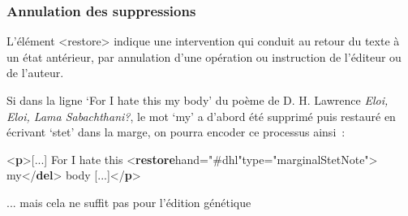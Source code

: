 \documentclass[]{beamer}\makeatletter
\begin{document}
\begin{frame}[fragile]
\frametitle{Annulation des suppressions}\par
 L’élément {\color{blue2}<restore>} indique une intervention qui conduit au      retour du texte à un état antérieur, par annulation d’une opération ou      instruction de l’éditeur ou de l’auteur. \par
 Si dans la ligne ‘For I hate this my body’ du poème de D. H.      Lawrence \textit{Eloi, Eloi, Lama Sabachthani?}, le mot       ‘my’ a d’abord été supprimé puis restauré en écrivant       ‘stet’ dans la marge, on pourra encoder ce processus ainsi :       
\bgroup\ttfamily\fontsize{8.5pt}{9pt}\selectfont\par
\begin{exampleblock}{}
\noindent\ttfamily\mbox{}{\color{blue1}<\textbf{p}>}[...] For I hate this {\color{blue1}<\textbf{restore}\hspace*{6pt}hand="{\color{blue2}#dhl}"\hspace*{6pt}type="{\color{blue2}marginalStetNote}">}\mbox{}\newline 
\hspace*{6pt}my{\color{blue1}</\textbf{del}>}\mbox{}\newline 
{} body [...]{\color{blue1}</\textbf{p}>}
\end{exampleblock}
\par\egroup
  \par\begin{exampleblock}{}
... mais cela ne suffit pas pour l'édition génétique\end{exampleblock}\par

\end{frame}
\end{document}
